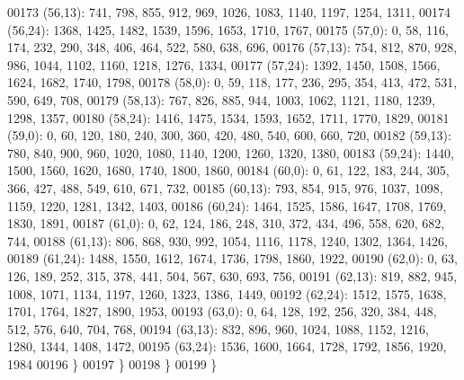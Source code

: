 \begin{DoxyCode}
00173       (56,13): 741, 798, 855, 912, 969, 1026, 1083, 1140, 1197, 1254, 1311,
00174       (56,24): 1368, 1425, 1482, 1539, 1596, 1653, 1710, 1767,
00175       (57,0): 0, 58, 116, 174, 232, 290, 348, 406, 464, 522, 580, 638, 696,
00176       (57,13): 754, 812, 870, 928, 986, 1044, 1102, 1160, 1218, 1276, 1334,
00177       (57,24): 1392, 1450, 1508, 1566, 1624, 1682, 1740, 1798,
00178       (58,0): 0, 59, 118, 177, 236, 295, 354, 413, 472, 531, 590, 649, 708,
00179       (58,13): 767, 826, 885, 944, 1003, 1062, 1121, 1180, 1239, 1298, 1357,
00180       (58,24): 1416, 1475, 1534, 1593, 1652, 1711, 1770, 1829,
00181       (59,0): 0, 60, 120, 180, 240, 300, 360, 420, 480, 540, 600, 660, 720,
00182       (59,13): 780, 840, 900, 960, 1020, 1080, 1140, 1200, 1260, 1320, 1380,
00183       (59,24): 1440, 1500, 1560, 1620, 1680, 1740, 1800, 1860,
00184       (60,0): 0, 61, 122, 183, 244, 305, 366, 427, 488, 549, 610, 671, 732,
00185       (60,13): 793, 854, 915, 976, 1037, 1098, 1159, 1220, 1281, 1342, 1403,
00186       (60,24): 1464, 1525, 1586, 1647, 1708, 1769, 1830, 1891,
00187       (61,0): 0, 62, 124, 186, 248, 310, 372, 434, 496, 558, 620, 682, 744,
00188       (61,13): 806, 868, 930, 992, 1054, 1116, 1178, 1240, 1302, 1364, 1426,
00189       (61,24): 1488, 1550, 1612, 1674, 1736, 1798, 1860, 1922,
00190       (62,0): 0, 63, 126, 189, 252, 315, 378, 441, 504, 567, 630, 693, 756,
00191       (62,13): 819, 882, 945, 1008, 1071, 1134, 1197, 1260, 1323, 1386, 1449,
00192       (62,24): 1512, 1575, 1638, 1701, 1764, 1827, 1890, 1953,
00193       (63,0): 0, 64, 128, 192, 256, 320, 384, 448, 512, 576, 640, 704, 768,
00194       (63,13): 832, 896, 960, 1024, 1088, 1152, 1216, 1280, 1344, 1408, 1472,
00195       (63,24): 1536, 1600, 1664, 1728, 1792, 1856, 1920, 1984
00196       \}
00197    \}
00198 \}
00199 \}
\end{DoxyCode}
